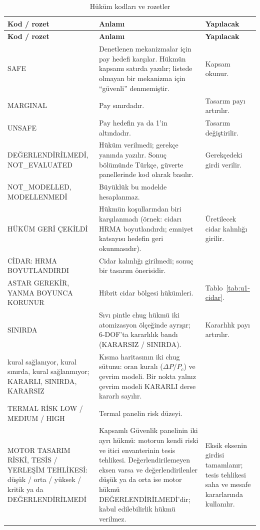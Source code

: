 \documentclass[11pt,a4paper]{article}
\newcommand{\ui}[1]{\textsf{#1}}
\begin{document}
\begin{longtable}{@{}>{\raggedright\arraybackslash}p{4.0cm}>{\raggedright\arraybackslash}p{6.0cm}>{\raggedright\arraybackslash}p{5.6cm}@{}}
\caption{Hüküm kodları ve rozetler}\label{tab:hukum}\\
\toprule
\textbf{Kod / rozet} & \textbf{Anlamı} & \textbf{Yapılacak} \\
\midrule\endfirsthead
\toprule
\textbf{Kod / rozet} & \textbf{Anlamı} & \textbf{Yapılacak} \\
\midrule\endhead
\bottomrule\endlastfoot
\ui{SAFE} & Denetlenen mekanizmalar için pay hedefi karşılar. Hükmün kapsamı satırda yazılır; listede olmayan bir mekanizma için ``güvenli'' denmemiştir. & Kapsam okunur. \\
\ui{MARGINAL} & Pay sınırdadır. & Tasarım payı artırılır. \\
\ui{UNSAFE} & Pay hedefin ya da 1'in altındadır. & Tasarım değiştirilir. \\
\ui{DEĞERLENDİRİLMEDİ}, \ui{NOT\_EVALUATED} & Hüküm verilmedi; gerekçe yanında yazılır. Sonuç bölümünde Türkçe, güverte panellerinde kod olarak basılır. & Gerekçedeki girdi verilir. \\
\ui{NOT\_MODELLED}, \ui{MODELLENMEDİ} & Büyüklük bu modelde hesaplanmaz. & \\
\ui{HÜKÜM GERİ ÇEKİLDİ} & Hükmün koşullarından biri karşılanmadı (örnek: cidarı HRMA boyutlandırdı; emniyet katsayısı hedefin geri okunmasıdır). & Üretilecek cidar kalınlığı girilir. \\
\ui{CİDAR: HRMA BOYUTLANDIRDI} & Cidar kalınlığı girilmedi; sonuç bir tasarım önerisidir. & \\
\ui{ASTAR GEREKİR}, \ui{YANMA BOYUNCA KORUNUR} & Hibrit cidar bölgesi hükümleri. & Tablo~\ref{tab:u1-cidar}. \\
\ui{SINIRDA} & Sıvı pintle chug hükmü iki atomizasyon ölçeğinde ayrışır; 6-DOF'ta kararlılık bandı (\ui{KARARSIZ / SINIRDA}). & Kararlılık payı artırılır. \\
\ui{kural sağlanıyor}, \ui{kural sınırda}, \ui{kural sağlanmıyor}; \ui{KARARLI}, \ui{SINIRDA}, \ui{KARARSIZ} & Kısma haritasının iki chug sütunu: oran kuralı ($\Delta P/P_c$) ve çevrim modeli. Bir nokta yalnız çevrim modeli \ui{KARARLI} derse kararlı sayılır. & \\
\ui{TERMAL RİSK} LOW / MEDIUM / HIGH & Termal panelin risk düzeyi. & \\
\ui{MOTOR TASARIM RİSKİ}, \ui{TESİS / YERLEŞİM TEHLİKESİ}: düşük / orta / yüksek / kritik ya da \ui{DEĞERLENDİRİLMEDİ} & Kapsamlı Güvenlik panelinin iki ayrı hükmü: motorun kendi riski ve itici envanterinin tesis tehlikesi. Değerlendirilemeyen eksen varsa ve değerlendirilenler düşük ya da orta ise motor hükmü \ui{DEĞERLENDİRİLMEDİ}'dir; kabul edilebilirlik hükmü verilmez. & Eksik eksenin girdisi tamamlanır; tesis tehlikesi saha ve mesafe kararlarında kullanılır. \\

\end{longtable}
\end{document}
